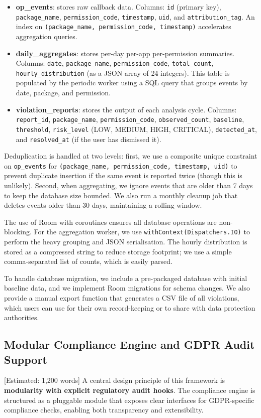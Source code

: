 \begin{itemize}
\item \textbf{op\_events}: stores raw callback data. Columns: \texttt{id} (primary key), \texttt{package\_name}, \texttt{permission\_code}, \texttt{timestamp}, \texttt{uid}, and \texttt{attribution\_tag}. An index on \texttt{(package\_name, permission\_code, timestamp)} accelerates aggregation queries.
\item \textbf{daily\_aggregates}: stores per-day per-app per-permission summaries. Columns: \texttt{date}, \texttt{package\_name}, \texttt{permission\_code}, \texttt{total\_count}, \texttt{hourly\_distribution} (as a JSON array of 24 integers). This table is populated by the periodic worker using a SQL query that groups events by date, package, and permission.
\item \textbf{violation\_reports}: stores the output of each analysis cycle. Columns: \texttt{report\_id}, \texttt{package\_name}, \texttt{permission\_code}, \texttt{observed\_count}, \texttt{baseline}, \texttt{threshold}, \texttt{risk\_level} (LOW, MEDIUM, HIGH, CRITICAL), \texttt{detected\_at}, and \texttt{resolved\_at} (if the user has dismissed it).
\end{itemize}

Deduplication is handled at two levels: first, we use a composite unique constraint on \texttt{op\_events} for \texttt{(package\_name, permission\_code, timestamp, uid)} to prevent duplicate insertion if the same event is reported twice (though this is unlikely). Second, when aggregating, we ignore events that are older than 7 days to keep the database size bounded. We also run a monthly cleanup job that deletes events older than 30 days, maintaining a rolling window.

The use of Room with coroutines ensures all database operations are non-blocking. For the aggregation worker, we use \texttt{withContext(Dispatchers.IO)} to perform the heavy grouping and JSON serialisation. The hourly distribution is stored as a compressed string to reduce storage footprint; we use a simple comma-separated list of counts, which is easily parsed.

To handle database migration, we include a pre-packaged database with initial baseline data, and we implement Room migrations for schema changes. We also provide a manual export function that generates a CSV file of all violations, which users can use for their own record-keeping or to share with data protection authorities.

\subsection{Modular Compliance Engine and GDPR Audit Support} [Estimated: 1,200 words]
A central design principle of this framework is \textbf{modularity with explicit regulatory audit hooks}. The compliance engine is structured as a pluggable module that exposes clear interfaces for GDPR-specific compliance checks, enabling both transparency and extensibility.

